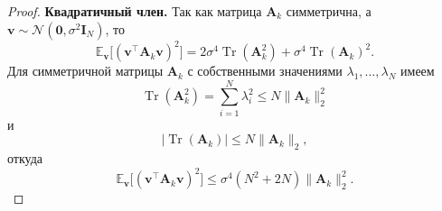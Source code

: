 \begin{proof}
    \textbf{Квадратичный член.}
    Так как матрица $\mathbf A_k$ симметрична, а $\mathbf v \sim \mathcal N(\mathbf 0, \sigma^2\mathbf I_N)$, то
    \begin{equation}
        \label{eq:squared-criterion-general-proof-step12}
        \mathbb E_{\mathbf v}
        \big[
            (\mathbf v^\top \mathbf A_k \mathbf v)^2
        \big]
        =
        2\sigma^4 \operatorname{Tr}(\mathbf A_k^2)
        +
        \sigma^4 \operatorname{Tr}(\mathbf A_k)^2.
    \end{equation}
    Для симметричной матрицы $\mathbf A_k$ с собственными значениями
    $\lambda_1, \ldots, \lambda_N$ имеем
    \begin{equation}
        \operatorname{Tr}(\mathbf A_k^2)
        =
        \sum_{i=1}^N \lambda_i^2
        \leqslant
        N\|\mathbf A_k\|_2^2
    \end{equation}
    и
    \begin{equation}
        |\operatorname{Tr}(\mathbf A_k)|
        \leqslant
        N\|\mathbf A_k\|_2,
    \end{equation}
    откуда
    \begin{equation}
        \label{eq:squared-criterion-general-proof-step13}
        \mathbb E_{\mathbf v}
        \big[
            (\mathbf v^\top \mathbf A_k \mathbf v)^2
        \big]
        \leqslant
        \sigma^4 (N^2+2N)\|\mathbf A_k\|_2^2.
    \end{equation}


\end{proof}
